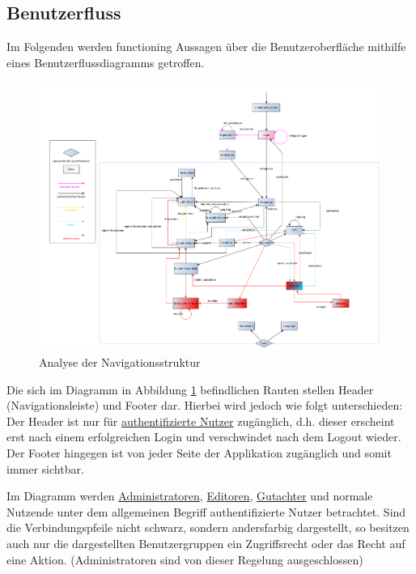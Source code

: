 \subsection{Benutzerfluss}
Im Folgenden werden functioning Aussagen über die Benutzeroberfläche mithilfe eines Benutzerflussdiagramms getroffen.

\begin{figure}[H]
	\centering
	\includegraphics[width=\linewidth]{graphics/benutzerFlussyEd}
	\caption{Analyse der Navigationsstruktur}
	\label{fig:benutzerfluss}
\end{figure}

Die sich im Diagramm in Abbildung \ref{fig:benutzerfluss} befindlichen Rauten stellen Header (Navigationsleiste) und Footer dar.
Hierbei wird jedoch wie folgt unterschieden: Der Header ist nur für \hyperref[glo:regnutzer]{authentifizierte Nutzer} zugänglich,
d.h. dieser erscheint erst nach einem erfolgreichen Login und verschwindet nach dem Logout wieder.
Der Footer hingegen ist von jeder Seite der Applikation zugänglich und somit immer sichtbar.

Im Diagramm werden \hyperref[glo:admin]{Administratoren}, \hyperref[glo:editor]{Editoren}, \hyperref[glo:gutachter]{Gutachter} und normale Nutzende unter dem allgemeinen Begriff
authentifizierte Nutzer betrachtet.
Sind die Verbindungspfeile nicht schwarz, sondern andersfarbig dargestellt, so besitzen auch nur die
dargestellten Benutzergruppen ein Zugriffsrecht oder das Recht auf eine Aktion. (Administratoren sind von dieser Regelung
ausgeschlossen)

